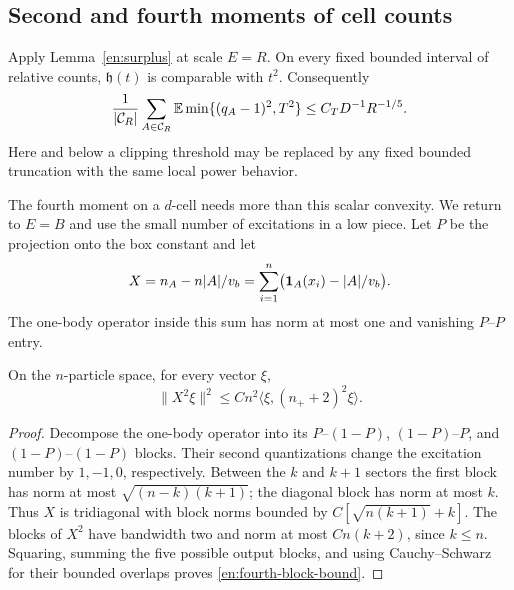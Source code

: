 \subsection{Second and fourth moments of cell counts}

Apply Lemma~\ref{en:surplus} at scale $E=R$.  On every fixed bounded
interval of relative counts, $\mathfrak h(t)$ is comparable with $t^2$.
Consequently
\begin{equation}\label{en:R-truncated}
 \frac1{|\mathcal C_R|}\sum_{A\in\mathcal C_R}
      \mathbb E\min\{(q_A-1)^2,T^2\}
          \le C_TD^{-1}R^{-1/5}.
\end{equation}
Here and below a clipping threshold may be replaced by any fixed
bounded truncation with the same local power behavior.

The fourth moment on a $d$-cell needs more than this scalar convexity.
We return to $E=B$ and use the small number of excitations in a low
piece.  Let $P$ be the projection onto the box constant and let
\[
 X=n_A-n|A|/v_b
      =\sum_{i=1}^n\bigl(\mathbf 1_A(x_i)-|A|/v_b\bigr).
\]
The one-body operator inside this sum has norm at most one and
vanishing $P$--$P$ entry.

\begin{lemma}\label{en:fourth-block}
On the $n$-particle space, for every vector $\xi$,
\begin{equation}\label{en:fourth-block-bound}
 \|X^2\xi\|^2\le Cn^2\langle\xi,(n_++2)^2\xi\rangle.
\end{equation}
\end{lemma}

\begin{proof}
Decompose the one-body operator into its $P$--$(1-P)$,
$(1-P)$--$P$, and $(1-P)$--$(1-P)$ blocks.  Their second quantizations
change the excitation number by $1,-1,0$, respectively.  Between the
$k$ and $k+1$ sectors the first block has norm at most
$\sqrt{(n-k)(k+1)}$; the diagonal block has norm at most $k$.
Thus $X$ is tridiagonal with block norms bounded by
$C[\sqrt{n(k+1)}+k]$.  The blocks of $X^2$ have bandwidth two and norm
at most $Cn(k+2)$, since $k\le n$.  Squaring, summing the five possible
output blocks, and using Cauchy--Schwarz for their bounded overlaps proves
\eqref{en:fourth-block-bound}.
\end{proof}

